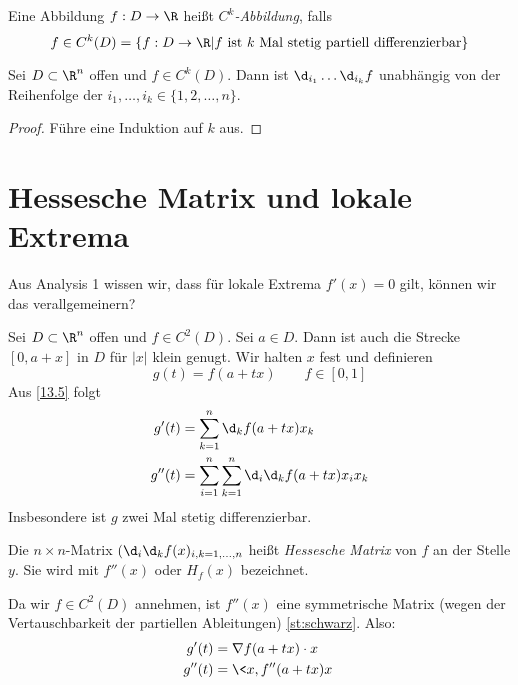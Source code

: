 \documentclass{mycourse}
\begin{document}
\begin{df}
	Eine Abbildung $f:D\to \R$ heißt \emph{$C^k$-Abbildung}, falls
	\[
		f \in C^k(D) = \{f:D\to \R|f \text{ ist $k$ Mal stetig partiell differenzierbar}\}
	\]
\end{df}

\begin{thm}
\label{st:schwarz}
Sei $D\subset \R^n$ offen und $f\in C^k(D)$. 
Dann ist $\d_{i_1}\dotsc\d_{i_k}f$ unabhängig von der Reihenfolge der $i_1,\dotsc,i_k\in\{1,2,\dotsc,n\}$.

\begin{proof}
Führe eine Induktion auf $k$ aus.
\end{proof}
\end{thm}

\setcounter{section}{13}
\setcounter{subsection}{5}
\section{Hessesche Matrix und lokale Extrema}

Aus Analysis 1 wissen wir, dass für lokale Extrema $f'(x)=0$ gilt, können wir das verallgemeinern?

Sei $D\subset \R^n$ offen und $f\in C^2(D)$. 
Sei $a\in D$.
Dann ist auch die Strecke $[0,a+x]$ in $D$ für $|x|$ klein genugt.
Wir halten $x$ fest und definieren
\[
g(t) = f(a+tx) \qquad f\in [0,1]
\]
Aus \ref{13.5} folgt
\begin{align*}
g'(t) &= \sum_{k=1}^n\d_kf(a+tx)x_k\\
g''(t) &= \sum_{i=1}^n\sum_{k=1}^n\d_i\d_kf(a+tx)x_ix_k
\end{align*}
Insbesondere ist $g$ zwei Mal stetig differenzierbar.

Die  $n\times n$-Matrix $(\d_i\d_kf(x)_{i,k=1,\dotsc,n}$ heißt \emph{Hessesche Matrix} von $f$ an der Stelle $y$.
Sie wird mit $f''(x)$ oder $H_f(x)$ bezeichnet.

Da wir $f\in C^2(D)$ annehmen, ist $f''(x)$ eine symmetrische Matrix (wegen der Vertauschbarkeit der partiellen Ableitungen) \ref{st:schwarz}.
Also:
\begin{align*}
g'(t) &= \nabla f(a+tx)\cdot x\\
g''(t) &= \<x,f''(a+tx)x\>
\end{align*}
\end{document}
